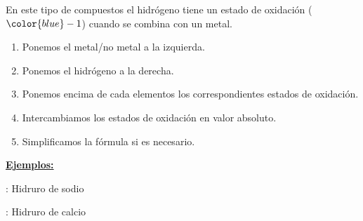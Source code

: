 \documentclass[12pt]{article}
\begin{document}
En este tipo de compuestos el hidrógeno tiene un estado de oxidación (${\color{blue}-1}$) cuando se combina con un metal.

\vspace*{2mm}

\begin{enumerate}[label=\itembolascolor{\arabic*}{mygreen}]
    \item Ponemos el metal/no metal a la izquierda.
    \item Ponemos el hidrógeno a la derecha.
    \item Ponemos encima de cada elementos los correspondientes estados de oxidación.
    \item Intercambiamos los estados de oxidación en valor absoluto.
    \item Simplificamos la fórmula si es necesario.
\end{enumerate}

\textbf{\uline{Ejemplos:}}

 : Hidruro de sodio \ch{->}   \ch{->} 

 : Hidruro de calcio \ch{->}   \ch{->} 

\vspace*{2mm}
\end{document}
